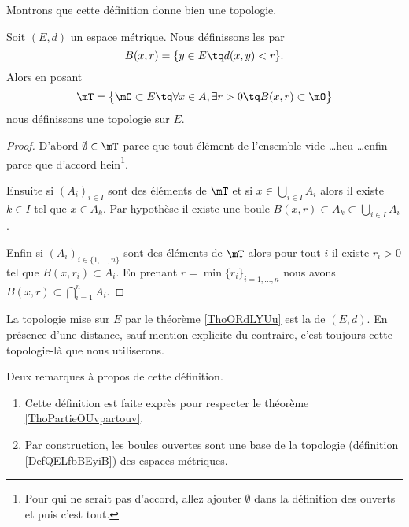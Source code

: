Montrons que cette définition donne bien une topologie.
\begin{theorem}     \label{ThoORdLYUu}
    Soit \( (E,d)\) un espace métrique. Nous définissons les  par
    \begin{equation}
        B(x,r)=\{ y\in E\tq d(x,y)<r \}.
    \end{equation}
    Alors en posant
    \begin{equation}
        \mT=\big\{  \mO\subset E  \tq\forall x\in A,\exists r>0\tq B(x,r)\subset \mO \big\}
    \end{equation}
    nous définissons une topologie sur \( E\).
\end{theorem}

\begin{proof}
    D'abord \( \emptyset\in\mT\) parce que tout élément de l'ensemble vide \ldots heu \ldots enfin parce que d'accord hein\footnote{Pour qui ne serait pas d'accord, allez ajouter \( \emptyset\) dans la définition des ouverts et puis c'est tout.}.

    Ensuite si \( (A_i)_{i\in I}\) sont des éléments de \( \mT\) et si \( x\in\bigcup_{i\in I}A_i\) alors il existe \( k\in I\) tel que \( x\in A_k\). Par hypothèse il existe une boule \( B(x,r)\subset A_k\subset\bigcup_{i\in I}A_i\).

    Enfin si \( (A_i)_{i\in\{ 1,\ldots, n \}}\) sont des éléments de \( \mT\) alors pour tout \( i\) il existe \( r_i>0\) tel que \( B(x,r_i)\subset A_i\). En prenant \( r=\min\{ r_i \}_{i=1,\ldots, n}\) nous avons $B(x,r)\subset\bigcap_{i=1}^nA_i.$
\end{proof}

\begin{definition}      \label{DefHTGYFpT}
    La topologie mise sur \( E\) par le théorème \ref{ThoORdLYUu} est la  de \( (E,d)\). En présence d'une distance, sauf mention explicite du contraire, c'est toujours cette topologie-là que nous utiliserons.
\end{definition}

\begin{remark}  \label{RemQDRooKnwKk}
    Deux remarques à propos de cette définition.
    \begin{enumerate}
        \item
            
    Cette définition est faite exprès pour respecter le théorème \ref{ThoPartieOUvpartouv}.

\item
    Par construction, les boules ouvertes sont une base de la topologie (définition \ref{DefQELfbBEyiB}) des espaces métriques.
    \end{enumerate}
\end{remark}

